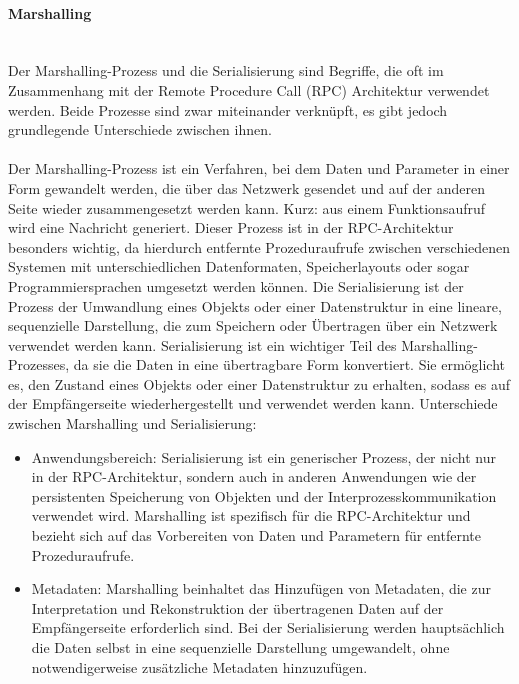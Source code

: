 \documentclass[../vs-script-first-v01.tex]{subfiles}
\begin{document}
\paragraph{Marshalling\\\\}
Der Marshalling-Prozess und die Serialisierung sind Begriffe, die oft im Zusammenhang mit der Remote Procedure Call (RPC) Architektur verwendet werden. Beide Prozesse sind zwar miteinander verknüpft, es gibt jedoch grundlegende Unterschiede zwischen ihnen.
\\\\
Der Marshalling-Prozess ist ein Verfahren, bei dem Daten und Parameter in einer Form gewandelt werden, die über das Netzwerk gesendet und auf der anderen Seite wieder zusammengesetzt werden kann. Kurz: aus einem Funktionsaufruf wird eine Nachricht generiert. Dieser Prozess ist in der RPC-Architektur besonders wichtig, da hierdurch entfernte Prozeduraufrufe zwischen verschiedenen Systemen mit unterschiedlichen Datenformaten, Speicherlayouts oder sogar Programmiersprachen umgesetzt werden können.
Die Serialisierung ist der Prozess der Umwandlung eines Objekts oder einer Datenstruktur in eine lineare, sequenzielle Darstellung, die zum Speichern oder Übertragen über ein Netzwerk verwendet werden kann. Serialisierung ist ein wichtiger Teil des Marshalling-Prozesses, da sie die Daten in eine übertragbare Form konvertiert. Sie ermöglicht es, den Zustand eines Objekts oder einer Datenstruktur zu erhalten, sodass es auf der Empfängerseite wiederhergestellt und verwendet werden kann. Unterschiede zwischen Marshalling und Serialisierung:
\begin{itemize} 
\item Anwendungsbereich: Serialisierung ist ein generischer Prozess, der nicht nur in der RPC-Architektur, sondern auch in anderen Anwendungen wie der persistenten Speicherung von Objekten und der Interprozesskommunikation verwendet wird. Marshalling ist spezifisch für die RPC-Architektur und bezieht sich auf das Vorbereiten von Daten und Parametern für entfernte Prozeduraufrufe.
\item Metadaten: Marshalling beinhaltet das Hinzufügen von Metadaten, die zur Interpretation und Rekonstruktion der übertragenen Daten auf der Empfängerseite erforderlich sind. Bei der Serialisierung werden hauptsächlich die Daten selbst in eine sequenzielle Darstellung umgewandelt, ohne notwendigerweise zusätzliche Metadaten hinzuzufügen.
\end{itemize} 
\end{document}
